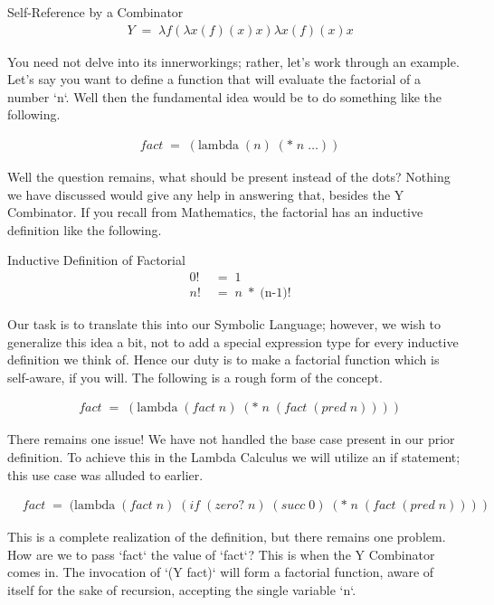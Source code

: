 Self-Reference by a Combinator
\begin{align*}
& Y \; = \; λf(λx(f)(x)x)λx(f)(x)x
\end{align*}

You need not delve into its innerworkings; rather, let's work through an example. 
Let's say you want to define a function that will evaluate the factorial of a 
number `n`. Well then the fundamental idea would be to do something like the 
following.

\begin{align*}
& fact \; = \; (\text{lambda} \; (n) \; (* \; n \; \dots))
\end{align*}

Well the question remains, what should be present instead of the dots? Nothing we 
have discussed would give any help in answering that, besides the Y Combinator. If 
you recall from Mathematics, the factorial has an inductive definition like the 
following.

Inductive Definition of Factorial
\begin{align*}
& 0! \; &= \; 1
\\& n! \; &= \; n \; * \; (\text{n-1)!}
\end{align*}

Our task is to translate this into our Symbolic Language; however, we wish to 
generalize this idea a bit, not to add a special expression type for every 
inductive definition we think of. Hence our duty is to make a factorial function 
which is self-aware, if you will. The following is a rough form of the concept.

\begin{align*}
& fact \; = \; (\text{lambda} \; (fact \; n) \; (* \; n \; (fact \; (pred \; n))))
\end{align*}

There remains one issue! We have not handled the base case present in our prior 
definition. To achieve this in the Lambda Calculus we will utilize an if 
statement; this use case was alluded to earlier.

\begin{align*}
& fact \; = \; (\text{lambda} \; (fact \; n) \; (if \; (zero? \; n) \; (succ \; 0) \; (* \; n \; (fact \; (pred \; n))))
\end{align*}

This is a complete realization of the definition, but there remains one problem. 
How are we to pass `fact` the value of `fact`? This is when the Y Combinator comes 
in. The invocation of `(Y fact)` will form a factorial function, aware of itself 
for the sake of recursion, accepting the single variable `n`.


